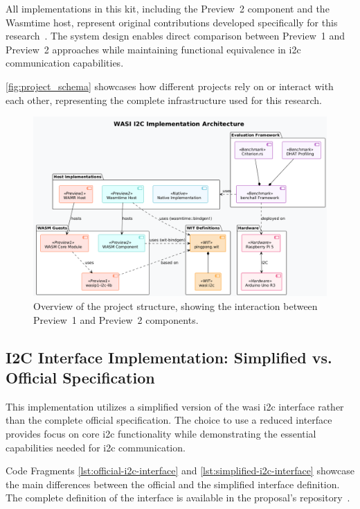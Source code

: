 All implementations in this kit, including the Preview~2 component and the Wasmtime host, represent original contributions developed specifically for this research~\cite{wamr-wasi-i2c}. The system design enables direct comparison between Preview~1 and Preview~2 approaches while maintaining functional equivalence in \acrshort{i2c} communication capabilities.

\autoref{fig:project_schema} showcases how different projects rely on or interact with each other, representing the complete infrastructure used for this research.
\begin{figure}[H]
    \centering
    \includegraphics[width=\textwidth]{images/project_schema.png}
    \caption{Overview of the project structure, showing the interaction between Preview~1 and Preview~2 components.}
    \label{fig:project_schema}
\end{figure}

\subsection{I2C Interface Implementation: Simplified vs. Official Specification}

This implementation utilizes a simplified version of the \acrshort{wasi} \acrshort{i2c} interface rather than the complete official specification. The choice to use a reduced interface provides focus on core \acrshort{i2c} functionality while demonstrating the essential capabilities needed for \acrshort{i2c} communication.

Code Fragments \ref{lst:official-i2c-interface} and \ref{lst:simplified-i2c-interface} showcase the main differences between the official and the simplified interface definition. The complete definition of the interface is available in the proposal's repository~\cite{wasi_i2c_proposal}.

